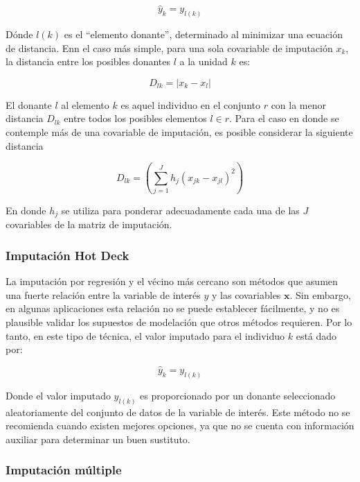 \documentclass[
  12pt,
  spanish,
]{book}
\begin{document}
\[\hat{y}_k = y_{l(k)}\]

Dónde \(l(k)\) es el ``elemento donante'', determinado al minimizar una ecuación de distancia. Enn el caso más simple, para una sola covariable de imputación \(x_k\), la distancia entre los posibles donantes \(l\) a la unidad \(k\) es:

\[
D_{lk} = |x_k - x_l|
\]

El donante \(l\) al elemento \(k\) es aquel individuo en el conjunto \(r\) con la menor distancia \(D_{lk}\) entre todos los posibles elementos \(l\in r\). Para el caso en donde se contemple más de una covariable de imputación, es posible considerar la siguiente distancia

\[
D_{lk} = \left( \sum_{j=1}^J h_j (x_{jk} - x_{jl})^2 \right)
\]

En donde \(h_j\) se utiliza para ponderar adecuadamente cada una de las \(J\) covariables de la matriz de imputación.

\hypertarget{imputaciuxf3n-hot-deck}{%
\subsubsection*{Imputación Hot Deck}\label{imputaciuxf3n-hot-deck}}

La imputación por regresión y el vécino más cercano son métodos que asumen una fuerte relación entre la variable de interés \(y\) y las covariables \(\mathbf{x}\). Sin embargo, en algunas aplicaciones esta relación no se puede establecer fácilmente, y no es plausible validar los supuestos de modelación que otros métodos requieren. Por lo tanto, en este tipo de técnica, el valor imputado para el individuo \(k\) está dado por:

\[\hat{y}_k = y_{l(k)}\]

Donde el valor imputado \(y_{l(k)}\) es proporcionado por un donante seleccionado aleatoriamente del conjunto de datos de la variable de interés. Este método no se recomienda cuando existen mejores opciones, ya que no se cuenta con información auxiliar para determinar un buen sustituto.

\hypertarget{imputaciuxf3n-muxfaltiple}{%
\subsubsection*{Imputación múltiple}\label{imputaciuxf3n-muxfaltiple}}
\end{document}
